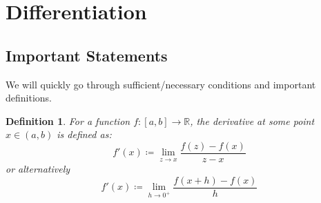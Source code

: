 \documentclass[10pt,letterpaper]{article} %
\newtheorem{lem}{Lemma}[section]
\newtheorem{defn}{Definition}[section]
\begin{document}

\pagebreak
\section{Differentiation}
\subsection{Important Statements}
We will quickly go through sufficient/necessary conditions and important definitions.

\begin{defn}
For a function $f: [a, b] \xrightarrow{} \mathbb{R}$, the derivative at some point $x \in (a, b)$ is defined as:
\begin{equation*}
f'(x) \coloneq \lim_{z \xrightarrow{} x}\frac{f(z) - f(x)}{z-x}
\end{equation*}
or alternatively
\begin{equation*}
f'(x) \coloneq \lim_{h \xrightarrow{} 0^+}\frac{f(x+h) - f(x)}{h}
\end{equation*}
\end{defn}
\end{document}
